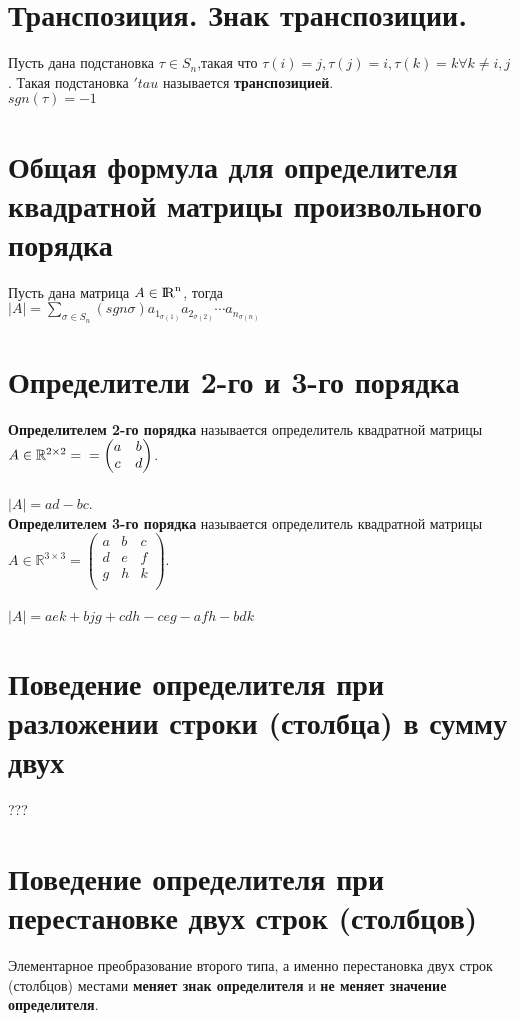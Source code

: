 \documentclass[a4paper,11pt]{report}
\DeclareMathOperator{\Mn}{{\rm I\!R}^{n}}
\begin{document}
\section{Транспозиция. Знак транспозиции.}
Пусть дана подстановка $\tau \in S_n$,такая что $\tau(i) = j, \tau(j) = i, \tau(k) = k \forall k \neq i, j$. 
Такая подстановка $'tau$ называется \textbf{транспозицией}.\\
$sgn(\tau) = -1$\\
\section{Общая формула для определителя квадратной матрицы произвольного порядка}
Пусть дана матрица $A \in \Mn$, тогда\\
$|A| = \sum\limits_{\sigma \in S_n}(sgn\sigma)a_1_{\sigma(1)}a_2_{\sigma(2)}\cdots{a_n_{\sigma(n)}}$
\section{Определители 2-го и 3-го порядка}
\textbf{Определителем 2-го порядка} называется определитель квадратной матрицы $A \in \mathbb{R}^{2\times{2}} = \\
= \begin{pmatrix}
a & b\\
c & d\\
\end{pmatrix}
$.\\\\
$|A| = ad - bc$.\\
\textbf{Определителем 3-го порядка} называется определитель квадратной матрицы $A \in \mathbb{R}^{3\times{3}} =
\begin{pmatrix}
 a & b & c\\
 d & e & f\\
 g & h & k\\
\end{pmatrix}
$.\\\\
$|A| = aek + bjg + cdh - ceg - afh - bdk$\\
\section{Поведение определителя при разложении строки (столбца) в сумму двух}
???
\section{Поведение определителя при перестановке двух строк (столбцов)} 
Элементарное преобразование второго типа, а именно перестановка двух строк (столбцов) местами
\textbf{меняет знак определителя} и \textbf{не меняет значение определителя}.
\end{document}
